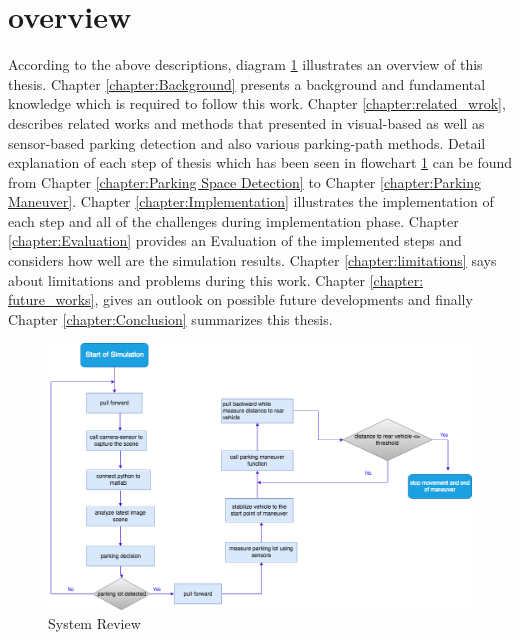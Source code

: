 \section{overview}
According to the above descriptions, diagram \ref{fig:sysreview} illustrates an overview of this thesis.
Chapter \ref{chapter:Background} presents a background and fundamental knowledge which is required to follow this work. Chapter \ref{chapter:related_wrok}, describes related works and methods that presented in visual-based as well as sensor-based parking detection and also various parking-path methods. Detail explanation of each step of thesis which has been seen in flowchart \ref{fig:sysreview} can be found from Chapter \ref{chapter:Parking Space Detection} to Chapter \ref{chapter:Parking Maneuver}. Chapter \ref{chapter:Implementation} illustrates the implementation of each step and all of the challenges during implementation phase. Chapter \ref{chapter:Evaluation} provides an Evaluation of the implemented steps and considers how well are the simulation results. Chapter \ref{chapter:limitations} says about limitations and problems during this work. Chapter \ref{chapter: future_works}, gives an outlook on possible future developments and finally Chapter \ref{chapter:Conclusion} summarizes this thesis.

\begin{figure}
\centering
     \includegraphics[width=14cm]{images/system.png} 
     \caption{System Review}
     \label{fig:sysreview}
\end{figure}